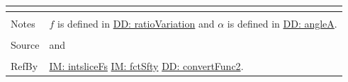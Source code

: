 \documentclass[12pt]{article}
\begin{document}
\begin{minipage}{\textwidth}
\begin{tabular}{p{} p{}}
\begin{symbDescription}
                                                  \end{symbDescription}
                                                  \\ \midrule \\
                                                  Notes & $f$ is defined in \hyperref[DD:ratioVariation]{DD: ratioVariation} and $α$ is defined in \hyperref[DD:angleA]{DD: angleA}.
                                                          \\ \midrule \\
                                                          Source & \cite{chen2005} and \cite{karchewski2012}
                                                                   \\ \midrule \\
                                                                   RefBy & \hyperref[IM:intsliceFs]{IM: intsliceFs} \hyperref[IM:fctSfty]{IM: fctSfty} \hyperref[DD:convertFunc2]{DD: convertFunc2}.
\\ \bottomrule \end{tabular}
\end{minipage}
\par~
\end{document}
